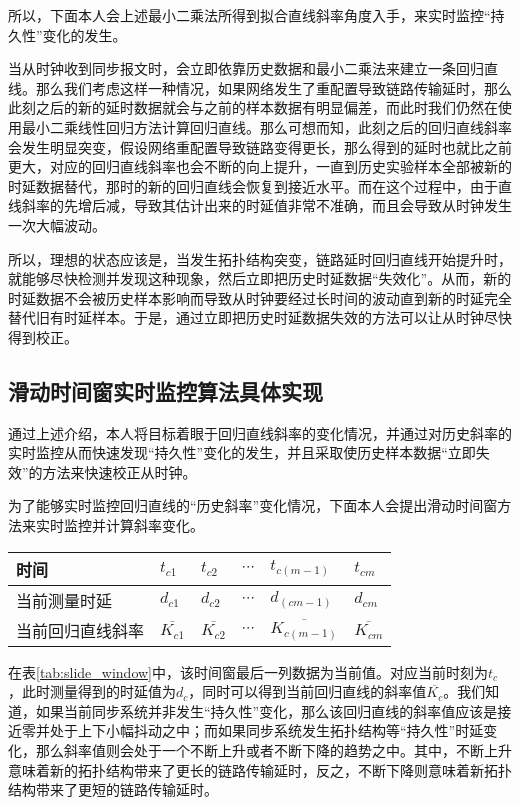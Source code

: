所以，下面本人会上述最小二乘法所得到拟合直线斜率角度入手，来实时监控“持久性”变化的发生。

当从时钟收到同步报文时，会立即依靠历史数据和最小二乘法来建立一条回归直线。那么我们考虑这样一种情况，如果网络发生了重配置导致链路传输延时，那么此刻之后的新的延时数据就会与之前的样本数据有明显偏差，而此时我们仍然在使用最小二乘线性回归方法计算回归直线。那么可想而知，此刻之后的回归直线斜率会发生明显突变，假设网络重配置导致链路变得更长，那么得到的延时也就比之前更大，对应的回归直线斜率也会不断的向上提升，一直到历史实验样本全部被新的时延数据替代，那时的新的回归直线会恢复到接近水平。而在这个过程中，由于直线斜率的先增后减，导致其估计出来的时延值非常不准确，而且会导致从时钟发生一次大幅波动。

所以，理想的状态应该是，当发生拓扑结构突变，链路延时回归直线开始提升时，就能够尽快检测并发现这种现象，然后立即把历史时延数据“失效化”。从而，新的时延数据不会被历史样本影响而导致从时钟要经过长时间的波动直到新的时延完全替代旧有时延样本。于是，通过立即把历史时延数据失效的方法可以让从时钟尽快得到校正。

\subsection{滑动时间窗实时监控算法具体实现}
通过上述介绍，本人将目标着眼于回归直线斜率的变化情况，并通过对历史斜率的实时监控从而快速发现“持久性”变化的发生，并且采取使历史样本数据“立即失效”的方法来快速校正从时钟。

为了能够实时监控回归直线的“历史斜率”变化情况，下面本人会提出滑动时间窗方法来实时监控并计算斜率变化。
\begin{table}[!hpb]
  \centering
  \begin{tabular}{llllll} \toprule
  	时间 & $t_{c1}$ & $t_{c2}$ & $\cdots$ & $t_{c(m-1)}$ & $t_{cm}$ \\ \midrule
    当前测量时延 & $d_{c1}$ & $d_{c2}$ & $\cdots$ & $d_{(cm-1)}$ & $d_{cm}$ \\ \midrule
    当前回归直线斜率 & $\overline{K_{c1}}$ & $\overline{K_{c2}}$ & $\cdots$ & $\overline{K_{c(m-1)}}$ & $\overline{K_{cm}}$  \\ \bottomrule
  \end{tabular}
\end{table}

在表\ref{tab:slide_window}中，该时间窗最后一列数据为当前值。对应当前时刻为$t_{c}$，此时测量得到的时延值为$d_{c}$，同时可以得到当前回归直线的斜率值$\overline{K_{c}}$。我们知道，如果当前同步系统并非发生“持久性”变化，那么该回归直线的斜率值应该是接近零并处于上下小幅抖动之中；而如果同步系统发生拓扑结构等“持久性”时延变化，那么斜率值则会处于一个不断上升或者不断下降的趋势之中。其中，不断上升意味着新的拓扑结构带来了更长的链路传输延时，反之，不断下降则意味着新拓扑结构带来了更短的链路传输延时。

